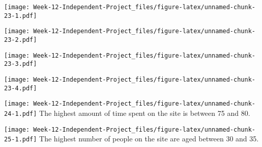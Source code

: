 \documentclass[
]{article}
\newenvironment{Shaded}{\begin{snugshade}}{\end{snugshade}}
\newcommand{\DocumentationTok}[1]{\textcolor[rgb]{0.56,0.35,0.01}{\textbf{\textit{#1}}}}
\newcommand{\FunctionTok}[1]{\textcolor[rgb]{0.00,0.00,0.00}{#1}}
\newcommand{\NormalTok}[1]{#1}
\newcommand{\SpecialCharTok}[1]{\textcolor[rgb]{0.00,0.00,0.00}{#1}}
\begin{document}
\texttt{[image: Week-12-Independent-Project\_files/figure-latex/unnamed-chunk-23-1.pdf]}

\begin{Shaded}
\end{Shaded}

\texttt{[image: Week-12-Independent-Project\_files/figure-latex/unnamed-chunk-23-2.pdf]}

\begin{Shaded}
\end{Shaded}

\texttt{[image: Week-12-Independent-Project\_files/figure-latex/unnamed-chunk-23-3.pdf]}

\begin{Shaded}
\end{Shaded}

\texttt{[image: Week-12-Independent-Project\_files/figure-latex/unnamed-chunk-23-4.pdf]}

\begin{Shaded}
\end{Shaded}

\texttt{[image: Week-12-Independent-Project\_files/figure-latex/unnamed-chunk-24-1.pdf]}
The highest amount of time spent on the site is between 75 and 80.

\begin{Shaded}
\end{Shaded}

\texttt{[image: Week-12-Independent-Project\_files/figure-latex/unnamed-chunk-25-1.pdf]}
The highest number of people on the site are aged between 30 and 35.
\end{document}
